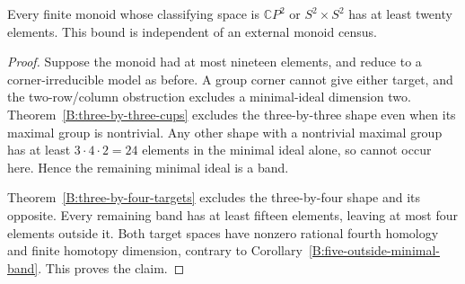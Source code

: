 \begin{corollary}
\label{B:fourdim-lower20}
Every finite monoid whose classifying space is $\mathbb CP^2$ or
$S^2\times S^2$ has at least twenty elements.
This bound is independent of an external monoid census.
\end{corollary}
\begin{proof}
Suppose the monoid had at most nineteen elements, and reduce to
a corner-irreducible model as before.  A group corner cannot give
either target, and the two-row/column obstruction excludes a
minimal-ideal dimension two.  Theorem~\ref{B:three-by-three-cups}
excludes the three-by-three shape even when its maximal group is
nontrivial.  Any other shape with a nontrivial maximal group has
at least $3\cdot4\cdot2=24$ elements in the minimal ideal alone,
so cannot occur here.  Hence the remaining minimal ideal is a band.

Theorem~\ref{B:three-by-four-targets} excludes the three-by-four
shape and its opposite.  Every remaining band has at least fifteen
elements, leaving at most four elements outside it.  Both target
spaces have nonzero rational fourth homology and finite homotopy
dimension, contrary to Corollary~\ref{B:five-outside-minimal-band}.
This proves the claim.
\end{proof}
